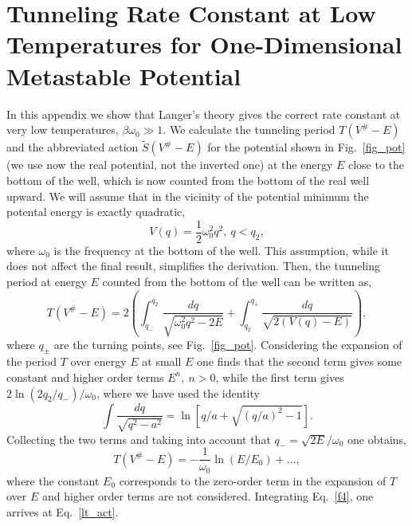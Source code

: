 \documentclass[journal=jpcafh,manuscript=article]{achemso}
\begin{document}
\section{Tunneling Rate Constant at Low Temperatures for
  One-Dimensional Metastable Potential}
In this appendix we show that Langer's theory gives the correct
rate constant at very low temperatures, $\beta\omega_0\gg1$.  We
calculate the tunneling period $T(V^\#-E)$ and the abbreviated action
$\tilde{S}(V^\#-E)$ for the potential shown in Fig.~\ref{fig_pot} (we
use now the real potential, not the inverted one) at the energy $E$
close to the bottom of the well, which is now counted from the bottom
of the real well upward. We will assume that in the vicinity of the
potential minimum the potental energy is exactly quadratic,
\begin{equation}
  \label{f1}
  V(q) = \frac{1}{2}\omega_0^2q^2,\ q<q_2,
\end{equation}
where $\omega_0$ is the frequency at the bottom of the well. This
assumption, while it does not affect the final result, simplifies the
derivation. Then, the tunneling period at energy $E$ counted from the
bottom of the well can be written as,
\begin{equation}
  \label{f2}
  T(V^\#-E)=2\left(\int_{q_-}^{q_2}\frac{dq}{\sqrt{\omega_0^2q^2-2E}}+\int_{q_2}^{q_+}\frac{dq}{\sqrt{2(V(q)-E)}}\right),
\end{equation}
where $q_\pm$ are the turning points, see
Fig.~\ref{fig_pot}. Considering the expansion of the period $T$ over
energy $E$ at small
$E$ one finds that the second term gives some constant and higher
order terms $E^n,\ n>0$, while the first term gives
$2\ln(2q_2/q_-)/\omega_0$, where we have used the identity
\begin{equation}
  \label{f3}
  \int \frac{dq}{\sqrt{q^2-a^2}}=\ln\!\left[q/a+\sqrt{(q/a)^2-1}\right].
\end{equation}
Collecting the two terms and taking into account that $q_-=\sqrt{2E}/\omega_0$ one obtains,
\begin{equation}
  \label{f4}
  T(V^\#-E)= -\frac{1}{\omega_0}\ln(E/E_0) + ...,
\end{equation}
where the constant $E_0$ corresponds to the zero-order term
in the expansion of $T$ over $E$ and higher order terms are not
considered. Integrating Eq.~\ref{f4}, one arrives at Eq.~\ref{lt_act}. 
\end{document}
